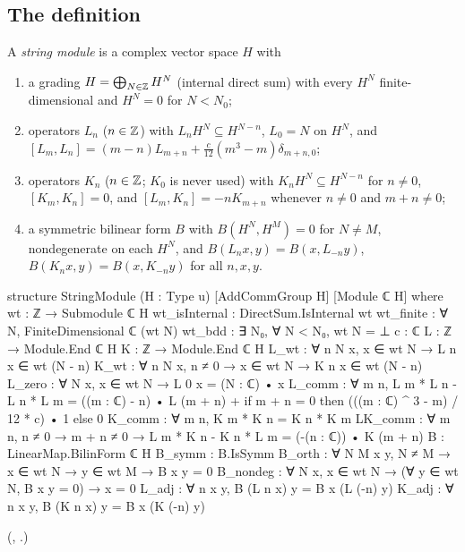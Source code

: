 \subsection{The definition}

\begin{definition}\label{ch18:def:stringmodule}
A \emph{string module} is a complex vector space $H$ with
\begin{enumerate}[label=(S\arabic*)]
\item a grading $H=\bigoplus_{N\in{\mathbb{Z}}}H^N$ (internal direct sum) with every $H^N$ finite-dimensional and
  $H^N=0$ for $N<N_0$;
\item operators $L_n$ ($n\in{\mathbb{Z}}$) with $L_nH^N\subseteq H^{N-n}$, $L_0=N$ on $H^N$, and
  $[L_m,L_n]=(m-n)L_{m+n}+\frac{c}{12}(m^3-m)\delta_{m+n,0}$;
\item operators $K_n$ ($n\in{\mathbb{Z}}$; $K_0$ is never used) with $K_nH^N\subseteq H^{N-n}$ for $n\neq0$,
  $[K_m,K_n]=0$, and $[L_m,K_n]=-nK_{m+n}$ whenever $n\neq0$ and $m+n\neq0$;
\item a symmetric bilinear form $B$ with $B(H^N,H^M)=0$ for $N\ne M$, nondegenerate on each $H^N$, and
  $B(L_nx,y)=B(x,L_{-n}y)$, $B(K_nx,y)=B(x,K_{-n}y)$ for all $n,x,y$.
\end{enumerate}
\end{definition}

\begin{leancode}
structure StringModule (H : Type u) [AddCommGroup H] [Module ℂ H] where
  wt : ℤ → Submodule ℂ H
  wt_isInternal : DirectSum.IsInternal wt
  wt_finite : ∀ N, FiniteDimensional ℂ (wt N)
  wt_bdd : ∃ N₀, ∀ N < N₀, wt N = ⊥
  c : ℂ
  L : ℤ → Module.End ℂ H
  K : ℤ → Module.End ℂ H
  L_wt : ∀ n N x, x ∈ wt N → L n x ∈ wt (N - n)
  K_wt : ∀ n N x, n ≠ 0 → x ∈ wt N → K n x ∈ wt (N - n)
  L_zero : ∀ N x, x ∈ wt N → L 0 x = (N : ℂ) • x
  L_comm : ∀ m n, L m * L n - L n * L m =
    ((m : ℂ) - n) • L (m + n) +
      if m + n = 0 then (((m : ℂ) ^ 3 - m) / 12 * c) • 1 else 0
  K_comm : ∀ m n, K m * K n = K n * K m
  LK_comm : ∀ m n, n ≠ 0 → m + n ≠ 0 →
    L m * K n - K n * L m = (-(n : ℂ)) • K (m + n)
  B : LinearMap.BilinForm ℂ H
  B_symm : B.IsSymm
  B_orth : ∀ N M x y, N ≠ M → x ∈ wt N → y ∈ wt M → B x y = 0
  B_nondeg : ∀ N x, x ∈ wt N → (∀ y ∈ wt N, B x y = 0) → x = 0
  L_adj : ∀ n x y, B (L n x) y = B x (L (-n) y)
  K_adj : ∀ n x y, B (K n x) y = B x (K (-n) y)
\end{leancode}
(, .)

